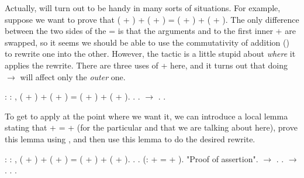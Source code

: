 \documentclass[12pt]{report}
\begin{document}
 Actually,  will turn out to be handy in many sorts of
    situations.  For example, suppose we want to prove that ( + )
    + ( + ) = ( + ) + ( + ). The only difference between the
    two sides of the = is that the arguments  and  to the
    first inner + are swapped, so it seems we should be able to
    use the commutativity of addition () to rewrite one
    into the other.  However, the  tactic is a little stupid
    about \textit{where} it applies the rewrite.  There are three uses of
    + here, and it turns out that doing  \ensuremath{\rightarrow} 
    will affect only the \textit{outer} one. \begin{coqdoccode}
\coqdocemptyline
\coqdocnoindent
{}  : \coqdockw{\ensuremath{\forall}}     : ,\coqdoceol
\coqdocindent{1.00em}
( + ) + ( + ) = ( + ) + ( + ).\coqdoceol
\coqdocnoindent
{}.\coqdoceol
\coqdocindent{1.00em}
    .\coqdoceol
\coqdocindent{1.00em}
 \ensuremath{\rightarrow} .\coqdoceol
\coqdocnoindent
{}.\coqdoceol
\coqdocemptyline
\end{coqdoccode}
To get  to apply at the point where we want it, we can
    introduce a local lemma stating that  +  =  +  (for
    the particular  and  that we are talking about here), prove
    this lemma using , and then use this lemma to do the
    desired rewrite. \begin{coqdoccode}
\coqdocemptyline
\coqdocnoindent
{}  : \coqdockw{\ensuremath{\forall}}     : ,\coqdoceol
\coqdocindent{1.00em}
( + ) + ( + ) = ( + ) + ( + ).\coqdoceol
\coqdocnoindent
{}.\coqdoceol
\coqdocindent{1.00em}
    .\coqdoceol
\coqdocindent{1.00em}
 (:  +  =  + ).\coqdoceol
\coqdocindent{2.00em}
 "Proof of assertion".\coqdoceol
\coqdocindent{2.00em}
 \ensuremath{\rightarrow} . .\coqdoceol
\coqdocindent{1.00em}
 \ensuremath{\rightarrow} . . .\coqdoceol
\coqdocemptyline
\end{coqdoccode}
\end{document}
